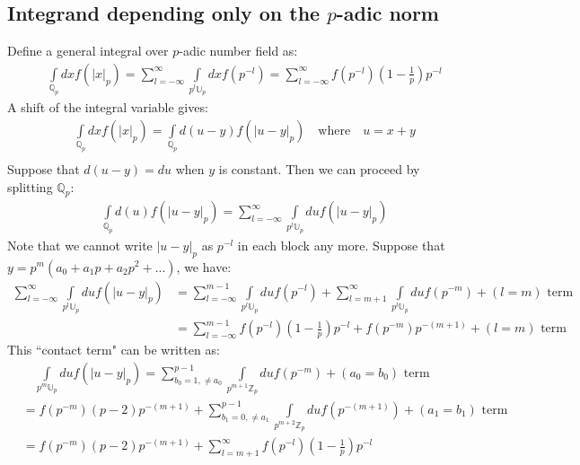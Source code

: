 \documentclass[12pt]{article}
\begin{document}
\subsection{Integrand depending only on the $p$-adic norm}
Define a general integral over $p$-adic number field as:
\begin{equation}
\begin{aligned}
&\quad \int\limits_{\mathbb{Q}_p} dx f(|x|_p)=\sum\limits_{l=-\infty}^{\infty}\int\limits_{p^l\mathbb{U}_p}dx f(p^{-l})=\sum\limits_{l=-\infty}^{\infty}f(p^{-l})(1-\frac{1}{p})p^{-l}
\end{aligned}
\end{equation}
A shift of the integral variable gives:
\begin{equation}
\begin{aligned}
&\quad \int\limits_{\mathbb{Q}_p} dx f(|x|_p)=\int\limits_{\mathbb{Q}_p} d(u-y) f(|u-y|_p) \quad\text{where}\quad u=x+y \\
\end{aligned}
\end{equation}
Suppose that $d(u-y)=du$ when $y$ is constant. Then we can proceed by splitting $\mathbb{Q}_p$:
\begin{equation}
\begin{aligned}
&\quad \int\limits_{\mathbb{Q}_p} d(u) f(|u-y|_p)=\sum\limits_{l=-\infty}^{\infty}\int\limits_{p^l\mathbb{U}_p}du f(|u-y|_p)
\end{aligned}
\end{equation}
Note that we cannot write $|u-y|_p$ as $p^{-l}$ in each block any more. Suppose that $y=p^m(a_0+a_1 p+a_2 p^2+...)$, we have:
\begin{equation}
\begin{aligned}
\sum\limits_{l=-\infty}^{\infty}\int\limits_{p^l\mathbb{U}_p}du f(|u-y|_p)&=\sum\limits_{l=-\infty}^{m-1}\int\limits_{p^l\mathbb{U}_p}du f(p^{-l})+\sum\limits_{l=m+1}^{\infty}\int\limits_{p^l\mathbb{U}_p}du f(p^{-m})+(l=m)\text{ term}\\
&=\sum\limits_{l=-\infty}^{m-1}f(p^{-l})(1-\frac{1}{p})p^{-l}+f(p^{-m})p^{-(m+1)}+(l=m)\text{ term}
\end{aligned}
\end{equation}
This ``contact term" can be written as:
\begin{equation}
\begin{aligned}
&\quad\int\limits_{p^m\mathbb{U}_p}du f(|u-y|_p)=\sum\limits_{b_0=1,\neq a_0}^{p-1}\int\limits_{p^{m+1}\mathbb{Z}_p}du f(p^{-m})+(a_0=b_0)\text{ term}\\
&=f(p^{-m})(p-2)p^{-(m+1)}+\sum\limits_{b_1=0,\neq a_1}^{p-1}\int\limits_{p^{m+2}\mathbb{Z}_p}du f(p^{-(m+1)})+(a_1=b_1)\text{ term}\\
&=f(p^{-m})(p-2)p^{-(m+1)}+\sum\limits_{l=m+1}^{\infty}f(p^{-l})(1-\frac{1}{p}) p^{-l}
\end{aligned}
\end{equation}
\end{document}
